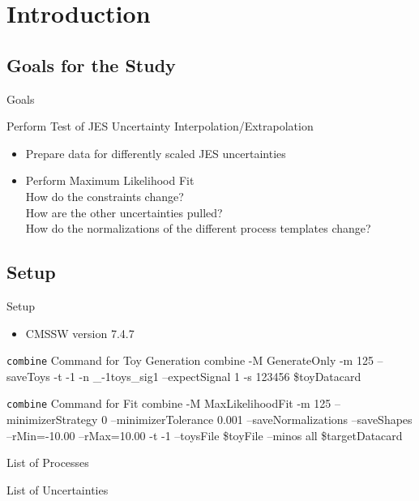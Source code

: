 \section{Introduction}
\subsection{Goals for the Study}
\begin{frame}{Goals}
\begin{block}{Perform Test of JES Uncertainty Interpolation/Extrapolation}
\begin{itemize}
\item Prepare data for differently scaled JES uncertainties\\
\item Perform Maximum Likelihood Fit\\
\rar How do the constraints change?\\
\rar How are the other uncertainties pulled?\\
\rar How do the normalizations of the different process templates change?

\end{itemize}
\end{block}

\end{frame}

\subsection{Setup}
\begin{frame}{Setup}
\begin{itemize}
\item CMSSW version 7.4.7\\
\end{itemize}
\begin{block}{\texttt{combine} Command for Toy Generation}
combine -M GenerateOnly -m 125 --saveToys -t -1 -n \_-1toys\_sig1 --expectSignal 1 -s 123456 \$toyDatacard
\end{block}
\begin{block}{\texttt{combine} Command for Fit}
combine -M MaxLikelihoodFit -m 125 --minimizerStrategy 0 --minimizerTolerance 0.001 --saveNormalizations --saveShapes --rMin=-10.00 --rMax=10.00 -t -1 --toysFile \$toyFile --minos all \$targetDatacard
\end{block}
\end{frame}

\begin{frame}{List of Processes}

\end{frame}
\begin{frame}{List of Uncertainties}

\end{frame}